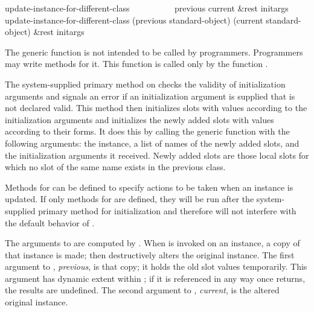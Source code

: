 \begin{defun}
update-instance-for-different-class~~~~~~~~~~ previous current &rest initargs \\
update-instance-for-different-class (previous standard-object)
     (current standard-object) &rest initargs

The generic function  is not
intended to be called by programmers.  Programmers may write
methods for it.  This function is called only by the function .

The system-supplied primary method on 
 checks the validity of
initialization arguments and signals an error if an initialization
argument is supplied that is not declared valid.  This method then
initializes slots with values according to the initialization
arguments and initializes the newly added slots with values according
to their  forms.  It does this by calling the generic
function  with the following arguments: the instance,
a list of names of the newly added slots, and the initialization
arguments it received.  Newly added slots are those local slots for which
no slot of the same name exists in the previous class.

Methods for
can be defined to
specify actions to be taken when an instance is updated.  If only 
 methods for  are
defined, they will be run after the system-supplied primary method for
initialization and therefore will not interfere with the default
behavior of .





The arguments to  are
computed by .  When  is invoked on
an instance, a copy of that instance is made;  then
destructively alters the original instance.  The first argument to
, {\it previous\/}, is that
copy; it holds the old slot values temporarily.  This argument has
dynamic extent within ; if it is referenced in any
way once  returns, the
results are undefined.  The second argument to 
, {\it current}, is the altered
original instance.



\end{defun}
